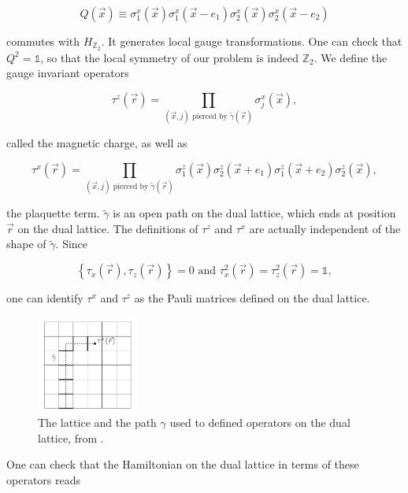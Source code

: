 \documentclass[11pt,openany]{article}
\begin{document}
\begin{equation}
	Q(\vec{x}) \equiv \sigma_1^x(\vec{x})\sigma_1^x(\vec{x}-e_1)\sigma_2^x(\vec{x})\sigma_2^x(\vec{x}-e_2)
\end{equation}

commutes with $H_{\mathds{Z}_2}$. It generates local gauge transformations. One can check that $Q^2=\mathds{1}$, so that the local symmetry of our problem is indeed $\mathds{Z}_2$. We define the gauge invariant operators

\begin{equation}
	\tau^z(\vec{r}) = \prod_{(\vec{x},j) \text{ pierced by } \tilde{\gamma}(\vec{r})}\sigma_j^x(\vec{x}),
\end{equation}

called the magnetic charge, as well as

\begin{equation}
	\tau^x(\vec{r}) = \prod_{(\vec{x},j) \text{ pierced by } \tilde{\gamma}(\vec{r})}\sigma_1^z(\vec{x})\sigma_2^z(\vec{x}+e_1)\sigma_1^z(\vec{x}+e_2)\sigma_2^z(\vec{x}),
\end{equation} 

the plaquette term. $\tilde{\gamma}$ is an open path on the dual lattice, which ends at position $\vec{r}$ on the dual lattice. The definitions of $\tau^z$ and $\tau^x$ are actually independent of the shape of $\tilde{\gamma}$. Since

\begin{equation}
	\left\{\tau_x(\vec{r}),\tau_z(\vec{r})\right\} = 0\text{ and }\tau_x^2(\vec{r}) = \tau_z^2(\vec{r}) = \mathds{1},
\end{equation} 

one can identify $\tau^x$ and $\tau^z$ as the Pauli matrices defined on  the dual lattice. 

\begin{figure}[H]
	\centering
	\includegraphics[width=0.3\textwidth]{Images/dual_lattice.png}
	\caption{The lattice and the path $\gamma$ used to defined operators on the dual lattice, from \cite{fradkin}.}
\end{figure}

One can check that the Hamiltonian on the dual lattice in terms of these operators reads
\end{document}
